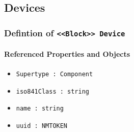 \subsection{Devices} \label{model:Devices}
\subsubsection{Defintion of \texttt{<<Block>> Device}}
  \label{type:Device}

\FloatBarrier



\FloatBarrier
\paragraph{Referenced Properties and Objects}

\begin{itemize}
\item \texttt{Supertype : Component}

\item \texttt{iso841Class : string}

\item \texttt{name : string}

\item \texttt{uuid : NMTOKEN}

\end{itemize}
\FloatBarrier
